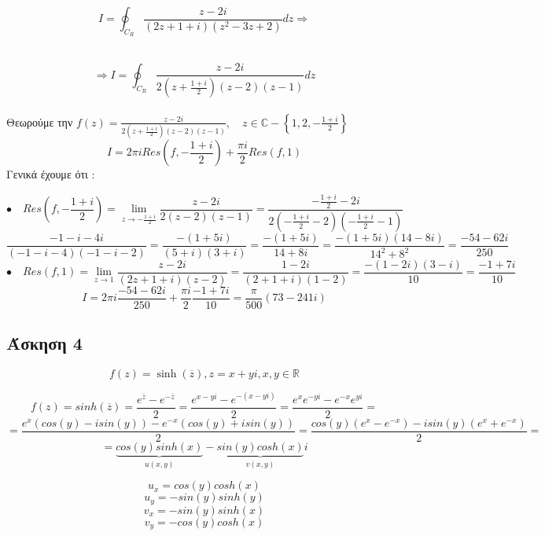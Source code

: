 \documentclass[12pt]{article}
\begin{document}
$$I = \oint_{C_R} \frac{z-2i}{(2z+1+i)(z^2-3z+2)} dz \Rightarrow $$
\\
$$
\Rightarrow
I = \oint_{C_R} \frac{z-2i}{2\left(z+\frac{1+i}{2}\right)(z-2)(z-1)} dz
$$
\\
Θεωρούμε την $ f(z)=\frac{z-2i}{2\left(z+\frac{1+i}{2}\right)(z-2)(z-1)} ,\quad z\in\mathbb{C} -\left\{ 1,2, -\frac{1+i}{2} \right\}$
\\
$$
I=2\pi i Res\left(f,-\frac{1+i}{2}\right) + \frac{\pi i}{2} Res(f,1)
$$
Γενικά έχουμε ότι :

$$
\bullet\quad
Res\left(f,-\frac{1+i}{2}\right)= \lim_{z \rightarrow -\frac{1+i}{2}} \frac{z-2i}{2(z-2)(z-1)}=\frac{-\frac{1+i}{2}-2i}{2(-\frac{1+i}{2}-2)(-\frac{1+i}{2}-1)} 
$$
$$
\frac{-1-i-4i}{(-1-i-4)(-1-i-2)}=\frac{-(1+5i)}{(5+i)(3+i)}=\frac{-(1+5i)}{14+8i}=\frac{-(1+5i)(14-8i)}{14^2+8^2}=\frac{-54-62i}{250}
$$
$$
\bullet \quad
Res(f,1)=\lim_{z \rightarrow 1} \frac{z-2i}{(2z+1+i)(z-2)}
=\frac{1-2i}{(2+1+i)(1-2)}=\frac{-(1-2i)(3-i)}{10}=\frac{-1+7i}{10}
$$
$$\boxed{
I=2\pi i \frac{-54-62i}{250}  + \frac{\pi i}{2} \frac{-1+7i}{10}=\frac{\pi}{500}(73-241i)}
$$
 \subsection{Άσκηση 4}
$$f(z)={\sinh(\overline{z})} ,z=x+yi , x,y\in\mathbb{R}$$

$$f(z)=sinh(\overline{z})=\frac{e^{\overline{z}}-e^{-\overline{z}}}{2}=\frac{e^{x-yi}-e^{-(x-yi)}}{2}=
\frac{e^{x}e^{-yi}-e^{-x}e^{yi}}{2}
=$$
$$
=
\frac{e^{x}(cos(y)-isin(y))-e^{-x}(cos(y)+isin(y))}{2}=
\frac{cos(y)(e^{x}-e^{-x})-isin(y)(e^{x}+e^{-x})}{2}
=$$
\[
=
\underbrace{cos(y)sinh(x)}_{\text{$u(x,y)$}}-
\underbrace{sin(y)cosh(x)}_{\text{$v(x,y)$}}i
\]


$$u_x=cos(y)cosh(x)
$$
$$u_y=-sin(y)sinh(y)
$$
$$v_x=-sin(y)sinh(x)
$$
$$v_y=-cos(y)cosh(x)
$$
\end{document}
